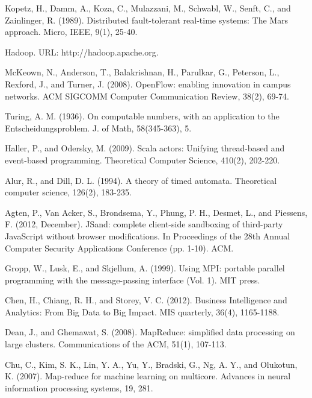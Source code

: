 \documentclass[10pt,reprint]{socc14}
\begin{document}
\begin{thebibliography}{}
Kopetz, H., Damm, A., Koza, C., Mulazzani, M., Schwabl, W., Senft, C., and Zainlinger, R. (1989). 
Distributed fault-tolerant real-time systems: The Mars approach. Micro, IEEE, 9(1), 25-40.

Hadoop. URL: http://hadoop.apache.org.

McKeown, N., Anderson, T., Balakrishnan, H., Parulkar, G., Peterson, L., Rexford, J., and Turner,
J. (2008). OpenFlow: enabling innovation in campus networks. ACM SIGCOMM Computer 
Communication Review, 38(2), 69-74.

Turing, A. M. (1936). On computable numbers, with an application to the Entscheidungsproblem. J. 
of Math, 58(345-363), 5.

Haller, P., and Odersky, M. (2009). Scala actors: Unifying thread-based and event-based 
programming. Theoretical Computer Science, 410(2), 202-220.

Alur, R., and Dill, D. L. (1994). A theory of timed automata. Theoretical computer science, 126(2), 
183-235.

Agten, P., Van Acker, S., Brondsema, Y., Phung, P. H., Desmet, L.,  and Piessens, F. (2012, 
December). JSand: complete client-side sandboxing of third-party JavaScript without browser 
modifications. In Proceedings of the 28th Annual Computer Security Applications Conference (pp. 
1-10). ACM.


Gropp, W., Lusk, E., and Skjellum, A. (1999). Using MPI: portable parallel programming with the 
message-passing interface (Vol. 1). MIT press.


Chen, H., Chiang, R. H., and Storey, V. C. (2012). Business Intelligence and Analytics: From Big Data 
to Big Impact. MIS quarterly, 36(4), 1165-1188.


Dean, J., and Ghemawat, S. (2008). MapReduce: simplified data processing on large clusters. 
Communications of the ACM, 51(1), 107-113.


Chu, C., Kim, S. K., Lin, Y. A., Yu, Y., Bradski, G., Ng, A. Y., and Olukotun, K. (2007). Map-reduce 
for machine learning on multicore. Advances in neural information processing systems, 19, 281.



\end{thebibliography}
\end{document}

